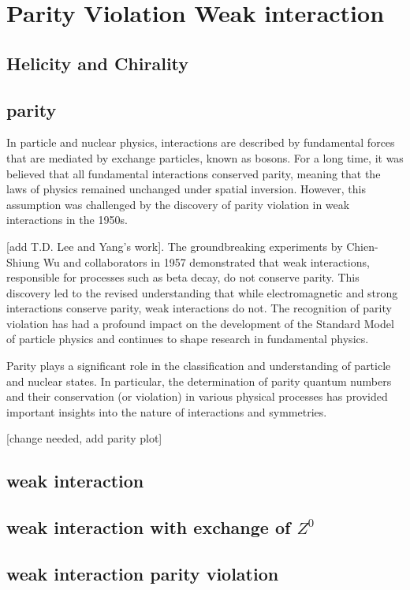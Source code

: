 \section{Parity Violation Weak interaction}
\subsection{Helicity and Chirality}
\subsection{parity}

In particle and nuclear physics, interactions are described by fundamental forces that are mediated by exchange particles, known as bosons. For a long time, it was believed that all fundamental interactions conserved parity, meaning that the laws of physics remained unchanged under spatial inversion. However, this assumption was challenged by the discovery of parity violation in weak interactions in the 1950s.

[add T.D. Lee and Yang's work]. The groundbreaking experiments by Chien-Shiung Wu and collaborators in 1957 demonstrated that weak interactions, responsible for processes such as beta decay, do not conserve parity. This discovery led to the revised understanding that while electromagnetic and strong interactions conserve parity, weak interactions do not. The recognition of parity violation has had a profound impact on the development of the Standard Model of particle physics and continues to shape research in fundamental physics.

Parity plays a significant role in the classification and understanding of particle and nuclear states. In particular, the determination of parity quantum numbers and their conservation (or violation) in various physical processes has provided important insights into the nature of interactions and symmetries.

 [change needed, add parity plot]

\subsection{weak interaction}

\subsection{weak interaction with exchange of $Z^0$}
\subsection{weak interaction parity violation}

